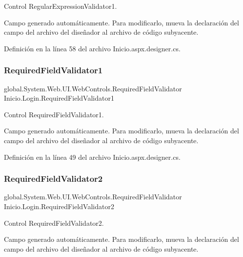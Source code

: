 Control Regular\+Expression\+Validator1. 

Campo generado automáticamente. Para modificarlo, mueva la declaración del campo del archivo del diseñador al archivo de código subyacente. 

Definición en la línea 58 del archivo Inicio.\+aspx.\+designer.\+cs.

\mbox{\label{classInicio_1_1Login_ab86e1edc9ca75591b9305e7c152beb95}} 
\subsubsection{\texorpdfstring{RequiredFieldValidator1}{RequiredFieldValidator1}}
{\footnotesize\ttfamily global.\+System.\+Web.\+U\+I.\+Web\+Controls.\+Required\+Field\+Validator Inicio.\+Login.\+Required\+Field\+Validator1\hspace{0.3cm}{\ttfamily [protected]}}



Control Required\+Field\+Validator1. 

Campo generado automáticamente. Para modificarlo, mueva la declaración del campo del archivo del diseñador al archivo de código subyacente. 

Definición en la línea 49 del archivo Inicio.\+aspx.\+designer.\+cs.

\mbox{\label{classInicio_1_1Login_a072466936abf9e49afe63fb3874ddee6}} 
\subsubsection{\texorpdfstring{RequiredFieldValidator2}{RequiredFieldValidator2}}
{\footnotesize\ttfamily global.\+System.\+Web.\+U\+I.\+Web\+Controls.\+Required\+Field\+Validator Inicio.\+Login.\+Required\+Field\+Validator2\hspace{0.3cm}{\ttfamily [protected]}}



Control Required\+Field\+Validator2. 

Campo generado automáticamente. Para modificarlo, mueva la declaración del campo del archivo del diseñador al archivo de código subyacente. 

